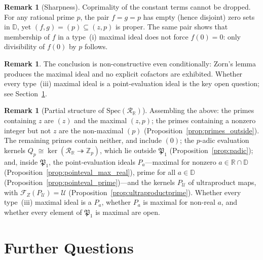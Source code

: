 \documentclass[12pt]{amsart}
\theoremstyle{definition}
\newtheorem{remark}[theorem]{Remark}
\newcommand{\D}{\mathbb{D}}
\newcommand{\Z}{\mathbb{Z}}
\newcommand{\R}{\mathbb{R}}
\newcommand{\mRR}{\mathcal{R}_{\mathbb{R}}}
\begin{document}
\begin{remark}[Sharpness]
\label{rem:bezoutsharp}
Coprimality of the constant terms cannot be dropped.  For any
rational prime $p$, the pair $f = g = p$ has empty (hence disjoint) zero
sets in $\D$,
yet $(f, g) = (p) \subseteq (z,p)$ is proper.  The same pair shows that
membership of $f$ in a type~(i) maximal ideal does not force $f(0) = 0$:
only divisibility of $f(0)$ by $p$ follows.
\end{remark}

\begin{remark}
The conclusion is non-constructive even conditionally: Zorn's lemma
produces the maximal ideal and no explicit cofactors are exhibited.
Whether every type~(iii) maximal ideal is a point-evaluation ideal is the
key open question; see Section~\ref{sec:open}.
\end{remark}

\begin{remark}[Partial structure of $\mathrm{Spec}(\mRR)$]
\label{rem:spec}
Assembling the above: the primes containing $z$ are $(z)$ and the
maximal $(z,p)$; the primes containing a nonzero integer but not $z$ are
the non-maximal $(p)$ (Proposition~\ref{prop:primes_outside}).  The
remaining primes contain neither, and include $(0)$; the $p$-adic
evaluation kernels $Q_p \cong \ker(\mRR \twoheadrightarrow \Z_p)$, which
lie outside $\mathfrak{P}_1$ (Proposition~\ref{prop:padic}); and, inside
$\mathfrak{P}_1$, the point-evaluation ideals $P_a$---maximal for
nonzero $a \in \R \cap \D$
(Proposition~\ref{prop:pointeval_max_real}), prime for all $a \in \D$
(Proposition~\ref{prop:pointeval_prime})---and the kernels
$P_\mathcal{U}$ of ultraproduct maps, with $\mathcal{F}_Z(P_\mathcal{U})
= \mathcal{U}$ (Proposition~\ref{prop:ultraproductprime}).  Whether every
type~(iii) maximal ideal is a $P_a$, whether $P_a$ is maximal for
non-real $a$, and whether every element of $\mathfrak{P}_1$ is maximal
are open.
\end{remark}

\section{Further Questions}
\label{sec:open}
\end{document}
